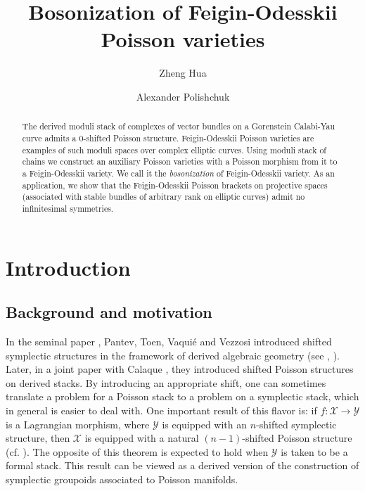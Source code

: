 \documentclass[reqno]{amsart}
\title{Bosonization of Feigin-Odesskii Poisson varieties}
\author{Zheng Hua}\date{}
\author{Alexander Polishchuk}
\theoremstyle{definition}
\theoremstyle{remark}
\newcommand{\sX}{\mathscr{X}}
\newcommand{\sY}{\mathscr{Y}}
\numberwithin{equation}{section}
\begin{document}
\maketitle

\begin{abstract}
The derived moduli stack of complexes of vector bundles on a Gorenstein Calabi-Yau curve admits a 0-shifted Poisson structure. Feigin-Odesskii Poisson varieties are examples of such moduli spaces over complex elliptic curves. Using moduli stack of chains we construct an auxiliary Poisson varieties with a Poisson morphism from it to a Feigin-Odesskii variety. We call it  the \emph{bosonization} of Feigin-Odesskii variety. As an application, we show that the Feigin-Odesskii Poisson brackets on projective spaces (associated with stable bundles of arbitrary rank on elliptic curves) admit no infinitesimal symmetries.
\end{abstract}


\section{Introduction}
\subsection{Background and motivation}
In the seminal paper \cite{PTVV}, Pantev, Toen, Vaqui\'e and Vezzosi introduced shifted symplectic structures
in the framework  of derived algebraic geometry (see \cite{Lu}, \cite{HAGII}). Later, in a joint paper with Calaque \cite{CPTVV},
they introduced shifted Poisson structures on derived stacks. 
By introducing an appropriate shift, one can sometimes translate a problem for a Poisson stack to a problem on a symplectic stack, which in general is easier to deal with. One important result of this flavor is: if $f: \sX\to \sY$ is a Lagrangian morphism, where $\sY$ is equipped with an $n$-shifted symplectic structure, then $\sX$ is equipped with a natural $(n-1)$-shifted Poisson structure (cf. \cite[Theorem 4.22]{MS2}). The opposite of this theorem is expected to hold when $\sY$ is taken to be a formal stack. This result can be viewed as a derived version of the construction of symplectic groupoids associated to Poisson manifolds.
\end{document}
